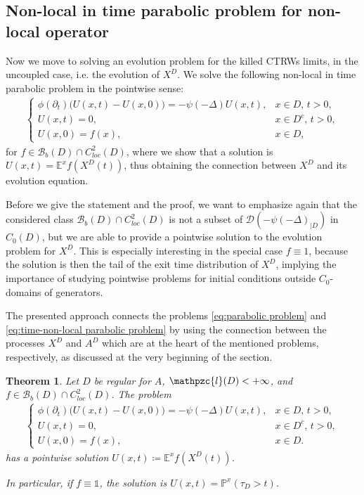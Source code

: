 \documentclass[reqno]{amsart}
\newtheorem{theorem}{Theorem}[section] %
\theoremstyle{remark}
\numberwithin{equation}{section} %
\newcommand{\Lpsi}{\psi(-\Delta)}
\newcommand{\LpsiD}{\Lpsi_{|D}}
\newcommand{\EE}{\mathds{E}}
\newcommand{\BB}{\mathcal{B}}
\newcommand{\DD}{\mathcal{D}}
\newcommand{\1}{\mathds{1}}
\begin{document}
	
	
	\subsection{Non-local in time parabolic problem for non-local operator}\label{ss:parabolic-non-local}
	Now we move to solving an evolution problem for the killed CTRWs limits, in the uncoupled case, i.e. the evolution of $X^D$. We solve the following non-local in time parabolic problem in the pointwise sense:
	\begin{align}
		\begin{cases}
			\phi(\partial_t) \big(U(x,t)-U(x,0)\big)=-\Lpsi U(x,t), & x\in D,\,t>0,\\
			U(x,t)=0,& x\in D^c,\, t>0,\\
			U(x,0)=f(x),& x\in D,
		\end{cases}\label{eq:time-non-local parabolic problem}
	\end{align}
	for $f\in \BB_b(D)\cap C^2_{loc}(D)$, where we show that a solution is $U(x,t)=\EE^xf(X^D(t))$, thus obtaining the connection between $X^D$ and its evolution equation.
	
	Before we give the statement and the proof, we want to emphasize again that the considered class $\BB_b(D)\cap C^2_{loc}(D)$ is not a subset of $\DD(-\LpsiD)$ in $C_0(D)$, but we are able to provide a pointwise solution to the evolution problem for $X^D$. This is especially interesting in the special case $f\equiv 1$, because the solution is then the tail of the exit time distribution of $X^D$, implying the importance of studying pointwise problems for initial conditions outside $C_0$-domains of generators.
	
	The presented approach connects the problems \eqref{eq:parabolic problem} and \eqref{eq:time-non-local parabolic problem} by using the connection between the processes $X^D$ and $A^D$ which are at the heart of the mentioned problems, respectively, as discussed at the very beginning of the section. 
	
	
	\begin{theorem}\label{t:solution time-non-local parabolic}
		Let $D$ be regular for $A$, $\mathpzc{l}(D)<+\infty$, and $f\in \BB_b(D)\cap C^2_{loc}(D)$. The problem
		\begin{align}
			\begin{cases}
				\phi(\partial_t) \big(U(x,t)-U(x,0)\big)=-\Lpsi U(x,t), & x\in D,\,t>0,\\
				U(x,t)=0,& x\in D^c,\, t>0,\\
				U(x,0)=f(x),& x\in D.
			\end{cases}\label{eq:time-non-local parabolic problem no2}
		\end{align}
		has a pointwise solution $U(x,t)\coloneqq \EE^xf(X^D(t))$. 
		
		In particular, if $f\equiv \1$, the solution is 
		$U(x,t)=\mathds{P}^x(\tau_D>t)$.
	\end{theorem}
	
\end{document}
